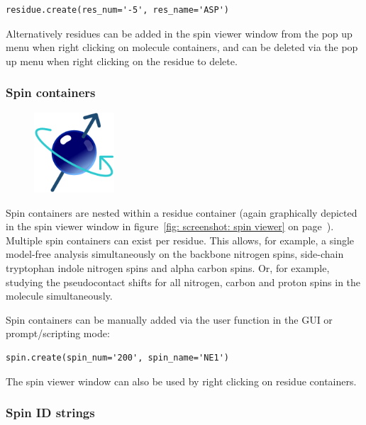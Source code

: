 \begin{lstlisting}
residue.create(res_num='-5', res_name='ASP')
\end{lstlisting}

Alternatively residues can be added in the spin viewer window from the pop up menu when right clicking on molecule containers, and can be deleted via the pop up menu when right clicking on the residue to delete.



\newpage
\subsubsection{Spin containers}

\begin{figure}[h]
  \includegraphics[width=3cm, bb=0 0 1701 1701]{graphics/misc/spin_600x600}
\end{figure}

Spin containers are nested within a residue container (again graphically depicted in the spin viewer window in figure~\ref{fig: screenshot: spin viewer} on page~\pageref{fig: screenshot: spin viewer}).
Multiple spin containers can exist per residue.
This allows, for example, a single model-free analysis simultaneously on the backbone nitrogen spins, side-chain tryptophan indole nitrogen spins and alpha carbon spins.
Or, for example, studying the pseudocontact shifts for all nitrogen, carbon and proton spins in the molecule simultaneously.

Spin containers can be manually added via the  user function in the GUI or prompt/scripting mode:

\begin{lstlisting}
spin.create(spin_num='200', spin_name='NE1')
\end{lstlisting}

The spin viewer window can also be used by right clicking on residue containers.



\subsubsection{Spin ID strings} \label{sect: spin ID}

